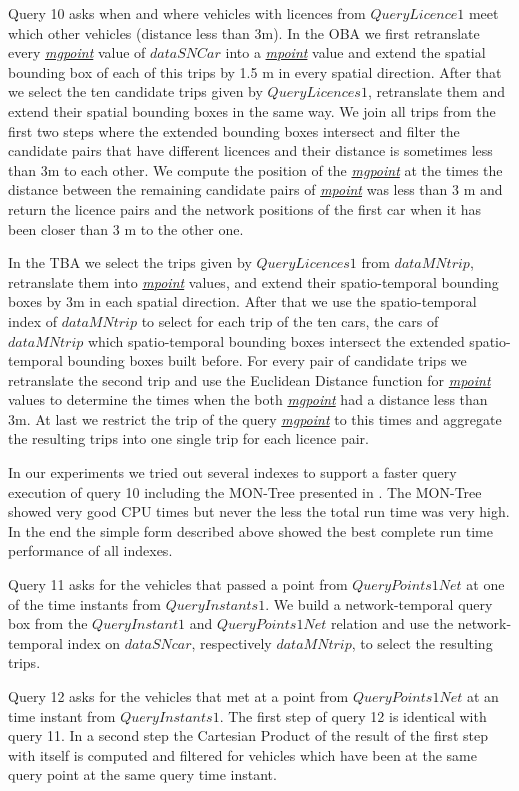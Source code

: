 \documentclass[a4paper]{article}
\newcommand{\dt}[1]{\textsl{\underline{#1}}}
\begin{document}
Query 10 asks when and where vehicles with licences from $QueryLicence1$ meet which
other vehicles (distance less than 3m). In the OBA we first retranslate every
\dt{mgpoint} value of $dataSNCar$ into a \dt{mpoint} value and extend the spatial
bounding box of each of this trips by 1.5 m in every spatial direction. After that we
select the ten candidate trips given by $QueryLicences1$, retranslate them and
extend their spatial bounding boxes in the same way. We join all trips from the
first two steps where the extended bounding boxes intersect and filter the
candidate pairs that have different licences and their distance is sometimes
less than 3m to each other. We compute the position of the \dt{mgpoint} at the
times the distance between the remaining candidate pairs of \dt{mpoint} was less
than 3 m and return the licence pairs and the network positions of the first car
when it has been closer than 3 m to the other one.

In the TBA we select the trips given by $QueryLicences1$ from
$dataMNtrip$, retranslate them into \dt{mpoint} values, and extend their spatio-temporal
bounding boxes by 3m in each spatial direction. After that we use the spatio-temporal
index of $dataMNtrip$ to select for each trip of the ten cars, the cars
of $dataMNtrip$ which spatio-temporal bounding boxes intersect the extended spatio-temporal
bounding boxes built before. For every pair of candidate trips we
retranslate the second trip and use the Euclidean Distance function for \dt{mpoint}
values to determine the times when the both \dt{mgpoint} had a distance less than 3m.
At last we restrict the trip of the query \dt{mgpoint} to this times and
aggregate the resulting trips into one single trip for each licence pair.

In our experiments we tried out several indexes to support a faster query execution
of query 10 including the MON-Tree presented in \cite{MONTreeAlmeidaGeoinformatica}. The MON-Tree showed
very good CPU times but never the less the total run time was very high. In the end
the simple form described above showed the best complete run time performance of all
indexes.

Query 11 asks for the vehicles that passed a point from $QueryPoints1Net$ at one of the
time instants from $QueryInstants1$. We build a network-temporal query box from the
$QueryInstant1$ and $QueryPoints1Net$ relation and use the network-temporal index
on $dataSNcar$, respectively $dataMNtrip$, to select the resulting trips.

Query 12 asks for the vehicles that met at a point from $QueryPoints1Net$ at an time
instant from $QueryInstants1$. The first step of query 12 is identical with query 11.
In a second step the Cartesian Product of the result of the first step with itself
is computed and filtered for vehicles which have been at the same query point
at the same query time instant.
\end{document}

